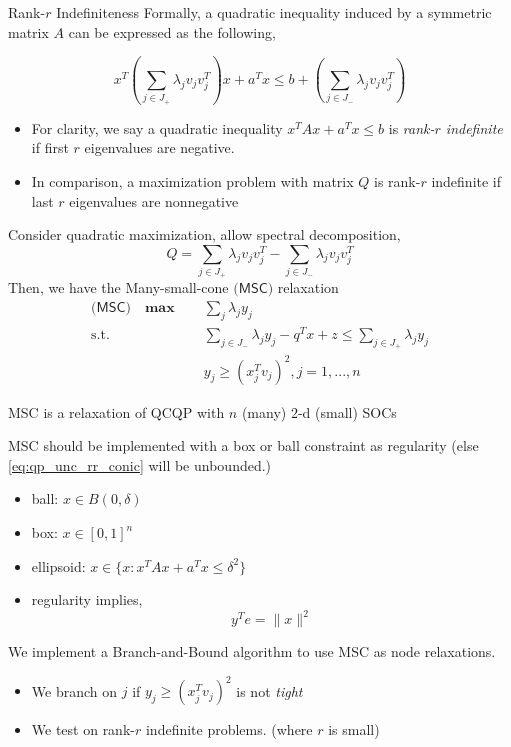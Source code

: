 \documentclass[aspectratio=1610, 10pt]{beamer}
\newcommand{\mx}{\mathbf{\max}\;}
\newcommand{\st}{\mathrm{s.t.\;}}
\begin{document}
\begin{frame}[allowframebreaks]{Rank-\(r\) Indefiniteness}
  Formally, a quadratic inequality induced by a symmetric matrix \(A\) can be expressed as the following,

  \begin{equation}
    x^T \left(\sum_{j\in J_+} \lambda_j v_jv_j^T\right)x +a^Tx \le b + \left(\sum_{j\in J_-} \lambda_j v_jv_j^T\right)
  \end{equation}

  \begin{itemize}
    \item For clarity, we say a quadratic inequality \(x^TAx + a^Tx \le b\) is \emph{rank-\(r\) indefinite} if first \(r\) eigenvalues are negative.
    \item In comparison, a maximization problem with matrix \(Q\) is rank-\(r\) indefinite if last \(r\) eigenvalues are nonnegative
  \end{itemize}

  Consider quadratic maximization, allow spectral decomposition,
  \[Q = \sum_{j \in J_{+}} \lambda_j v_jv_j^T - \sum_{j \in J_{-}} \lambda_j v_jv_j^T \]
  Then, we have the Many-small-cone \(\textsf{(MSC)} \) relaxation
  \begin{equation}\label{eq:qp_unc_rr_conic}
    \begin{aligned}
      \textsf{(MSC)} \quad \mx \quad & \sum_j \lambda_j y_j                                                               \\
      \st \quad                      & \sum_{j \in J_{-}} \lambda_{j} y_j - q^T x+z \le  \sum_{j \in J_{+}} \lambda_j y_j \\
                                     & y_j \ge (x_j^T v_j)^2, j= 1, ..., n
    \end{aligned}
  \end{equation}

  MSC is a relaxation of QCQP with \(n\) (many) \(2\)-d (small) SOCs
  \framebreak

  MSC should be implemented with a box or ball constraint as regularity (else \eqref{eq:qp_unc_rr_conic} will be unbounded.)
  \begin{itemize}
    \item ball: \(x\in B(0, \delta)\)
    \item box: \(x\in [0, 1]^n\)
    \item ellipsoid: \(x \in \{x: x^TAx + a^Tx \le \delta^2\}\)
    \item regularity implies,
          \begin{equation}
            y^Te = \|x\|^2
          \end{equation}
  \end{itemize}

  We implement a Branch-and-Bound algorithm to use MSC as node relaxations.
  \begin{itemize}
    \item We branch on \(j\) if \(y_j \ge (x_j^T v_j)^2\) is not \emph{tight}
    \item We test on rank-\(r\) indefinite problems. (where \(r\) is small)
  \end{itemize}
\end{frame}
\end{document}
